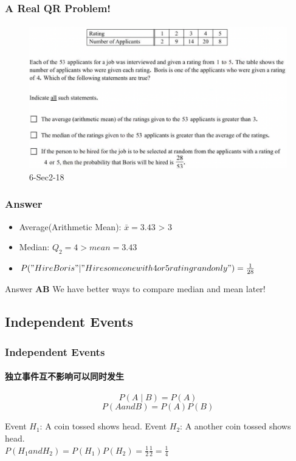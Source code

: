 \documentclass[
	11pt, %
]{beamer}
\begin{document}
\begin{frame}
	\frametitle{A Real QR Problem!}
	\framesubtitle{}
	\begin{figure}
		\includegraphics[width=\linewidth]{Conditional_Probability_Example_Question.png}
		\caption{6-Sec2-18}
	\end{figure}


\end{frame}


\begin{frame}
	\frametitle{Answer}
	\begin{itemize}
		\item	Average(Arithmetic Mean): $\bar{x} =3.43 $ > 3
		\item Median: $Q_2 = 4 > mean = 3.43$ 
		\item $P("Hire Boris" | "Hire someone with 4 or 5 rating randonly") = \frac{1}{28}$
	\end{itemize}
	\pause
	\bigskip
	Answer \textbf{AB } \alert{We have better ways to compare median and mean later!}
\end{frame}

\subsection{Independent Events}




\begin{frame}
	\frametitle{Independent Events}
	\framesubtitle{独立事件互不影响可以同时发生}
	
	\begin{definition}
	 $$P(A\mid B) = P(A)$$
	 $$P(A and B) = P(A) P(B)$$

	\end{definition}
	\begin{example}
		Event $H_1$: A coin tossed shows head.
		Event $H_2$: A another coin tossed shows head.\\
		$P(H_1 and H_2)  = P(H_1)P(H_2) =\frac{1}{2}\frac{1}{2} = \frac{1}{4}$
	\end{example}
\end{frame}
\end{document}
